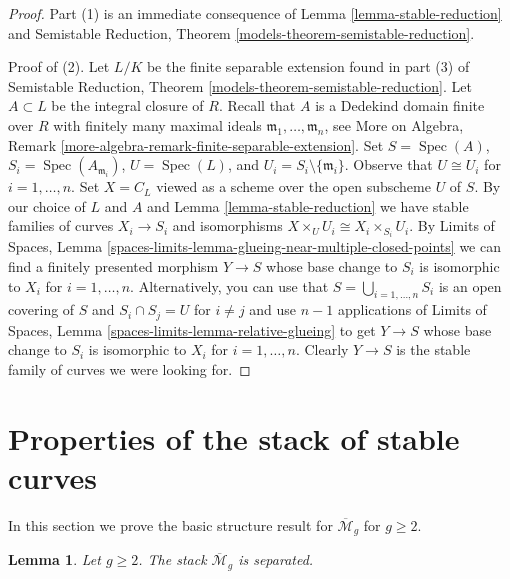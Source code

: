 \documentclass{stacks-project}
\theoremstyle{plain}
\newtheorem{lemma}[subsection]{Lemma}
\theoremstyle{definition}
\theoremstyle{remark}
\numberwithin{equation}{subsection}
\def\Spec{\mathop{\mathrm{Spec}}}
\begin{document}
\begin{proof}
Part (1) is an immediate consequence of Lemma \ref{lemma-stable-reduction} and
Semistable Reduction, Theorem \ref{models-theorem-semistable-reduction}.

\medskip\noindent
Proof of (2). Let $L/K$ be the finite separable extension found in part (3) of
Semistable Reduction, Theorem \ref{models-theorem-semistable-reduction}.
Let $A \subset L$ be the integral closure of $R$.
Recall that $A$ is a Dedekind domain finite over $R$ with
finitely many maximal ideals $\mathfrak m_1, \ldots, \mathfrak m_n$, see
More on Algebra, Remark \ref{more-algebra-remark-finite-separable-extension}.
Set $S = \Spec(A)$, $S_i = \Spec(A_{\mathfrak m_i})$,
$U = \Spec(L)$, and $U_i = S_i \setminus \{\mathfrak m_i\}$.
Observe that $U \cong U_i$ for $i = 1, \ldots, n$.
Set $X = C_L$ viewed as a scheme over the open subscheme $U$ of $S$.
By our choice of $L$ and $A$ and Lemma \ref{lemma-stable-reduction}
we have stable families of curves $X_i \to S_i$ and isomorphisms
$X \times_U U_i \cong X_i \times_{S_i} U_i$.
By Limits of Spaces, Lemma
\ref{spaces-limits-lemma-glueing-near-multiple-closed-points}
we can find a finitely presented morphism $Y \to S$
whose base change to $S_i$ is isomorphic to $X_i$ for $i = 1, \ldots, n$.
Alternatively, you can use that $S = \bigcup_{i = 1, \ldots, n} S_i$
is an open covering of $S$ and $S_i \cap S_j = U$ for $i \not = j$
and use $n - 1$ applications of
Limits of Spaces, Lemma \ref{spaces-limits-lemma-relative-glueing}
to get $Y \to S$ whose
base change to $S_i$ is isomorphic to $X_i$ for $i = 1, \ldots, n$.
Clearly $Y \to S$ is the stable family of curves we were looking for.
\end{proof}






\section{Properties of the stack of stable curves}
\label{section-properties-stable}

\noindent
In this section we prove the basic structure result for
$\overline{\mathcal{M}}_g$ for $g \geq 2$.

\begin{lemma}
\label{lemma-stable-separated}
Let $g \geq 2$. The stack $\overline{\mathcal{M}}_g$ is separated.
\end{lemma}
\end{document}
